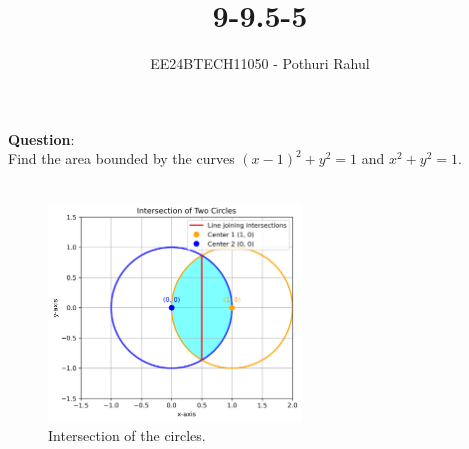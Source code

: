 \documentclass[journal]{IEEEtran}
\begin{document}

\vspace{3cm}

\title{9-9.5-5}
\author{EE24BTECH11050 - Pothuri Rahul}
{\let\newpage\relax\maketitle}

\renewcommand{\thefigure}{\theenumi}
\renewcommand{\thetable}{\theenumi}
\setlength{\intextsep}{10pt} %


\renewcommand{\thetable}{\theenumi}
\textbf{Question}:\\
Find the area bounded by the curves $(x-1)^2 + y^2 = 1$ and $x^2 + y^2 = 1$.  \\
\solution \\
\begin{figure}[h]
    \centering
    \includegraphics[width=0.6\textwidth]{fig.png}
    \caption{Intersection of the circles.}
\end{figure}
\end{document}
